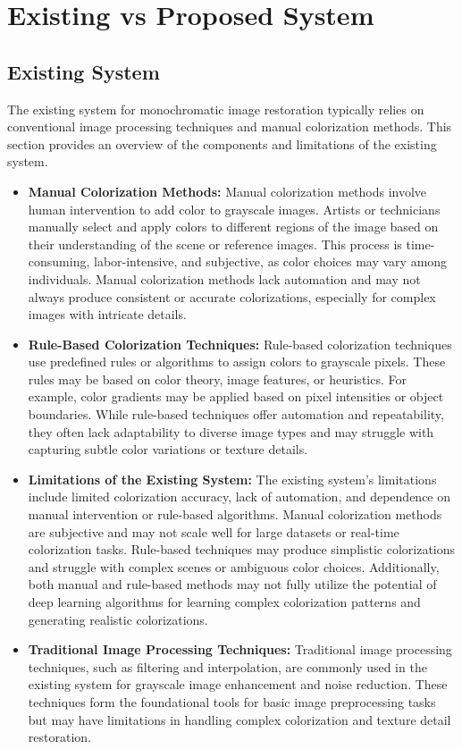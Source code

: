 \section{Existing vs Proposed System}

\subsection{Existing System}
The existing system for monochromatic image restoration typically relies on conventional image processing techniques and manual colorization methods. This section provides an overview of the components and limitations of the existing system.

\begin{itemize}
    \item \textbf{Manual Colorization Methods:} Manual colorization methods involve human intervention to add color to grayscale images. Artists or technicians manually select and apply colors to different regions of the image based on their understanding of the scene or reference images. This process is time-consuming, labor-intensive, and subjective, as color choices may vary among individuals. Manual colorization methods lack automation and may not always produce consistent or accurate colorizations, especially for complex images with intricate details.
    \item\textbf{Rule-Based Colorization Techniques:} Rule-based colorization techniques use predefined rules or algorithms to assign colors to grayscale pixels. These rules may be based on color theory, image features, or heuristics. For example, color gradients may be applied based on pixel intensities or object boundaries. While rule-based techniques offer automation and repeatability, they often lack adaptability to diverse image types and may struggle with capturing subtle color variations or texture details.
    \item \textbf{Limitations of the Existing System:} The existing system's limitations include limited colorization accuracy, lack of automation, and dependence on manual intervention or rule-based algorithms. Manual colorization methods are subjective and may not scale well for large datasets or real-time colorization tasks. Rule-based techniques may produce simplistic colorizations and struggle with complex scenes or ambiguous color choices. Additionally, both manual and rule-based methods may not fully utilize the potential of deep learning algorithms for learning complex colorization patterns and generating realistic colorizations.
    \item \textbf{Traditional Image Processing Techniques:} Traditional image processing techniques, such as filtering and interpolation, are commonly used in the existing system for grayscale image enhancement and noise reduction. These techniques form the foundational tools for basic image preprocessing tasks but may have limitations in handling complex colorization and texture detail restoration.
\end{itemize}

